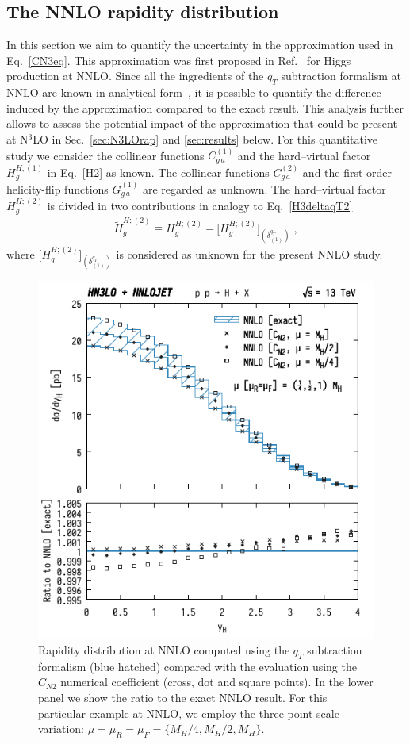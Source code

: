 \documentclass[12pt]{article}
\def\beeq{\begin{eqnarray}}
\def\eeeq{\end{eqnarray}}
\DeclareRobustCommand{\qt}{q_T}
\begin{document}
\subsection{The NNLO rapidity distribution}
\label{sec:NNLOrap}
In this section we aim to quantify the uncertainty in the approximation used in Eq.~\eqref{CN3eq}. This approximation was first proposed in Ref.~\cite{Bozzi:2005wk} for Higgs production at NNLO. Since all the ingredients of the $\qt$ subtraction formalism at NNLO are known in analytical form~\cite{Catani:2011kr}, it is possible to quantify the difference induced by the approximation compared to the exact result. This analysis further allows to assess the potential impact of the approximation that could be present at N$^3$LO in Sec.~\ref{sec:N3LOrap} and \ref{sec:results} below. For this quantitative study we consider the collinear functions $C^{(1)}_{g\,a}$ and the hard--virtual factor $H^{H;(1)}_g$ in Eq.~\eqref{H2} as known. The collinear functions $C^{(2)}_{g\,a}$ and the first order helicity-flip functions $G^{(1)}_{g\,a}$ are regarded as unknown. The hard--virtual factor $H^{H;(2)}_g$ is divided in two contributions in analogy to Eq.~\eqref{H3deltaqT2}
\beeq
\widetilde{H}^{H;(2)}_{g}  \equiv H^{H;(2)}_g  -  \big[H^{H;(2)}_{g}\big]_{(\delta^{\qt}_{(1)})} \;,
\eeeq
where $\big[H^{H;(2)}_{g}\big]_{(\delta^{\qt}_{(1)})}$ is considered as unknown for the present NNLO study. 

\begin{figure}[t]
\centering
\includegraphics[width=.6\linewidth]{./new_figures/yH_B02_CN}
\caption{\label{fig:yHCN}{Rapidity distribution at NNLO computed using the $\qt$ subtraction formalism (blue hatched) compared with the evaluation using the $C_{N2}$ numerical coefficient (cross, dot and square points). In the lower panel we show the ratio to the exact NNLO result. For this particular example at NNLO, we employ the three-point scale variation: $\mu=\mu_{R}=\mu_{F}=\{M_{H}/4,M_{H}/2,M_{H}\}$. 
}}
\end{figure}
\end{document}
